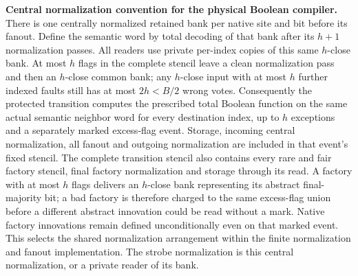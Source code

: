\textbf{Central normalization convention for the physical Boolean compiler.} There is one centrally normalized retained bank per native site and bit before its fanout. Define the semantic word by total decoding of that bank after its \(h+1\) normalization passes. All readers use private per-index copies of this same \(h\)-close bank. At most \(h\) flags in the complete stencil leave a clean normalization pass and then an \(h\)-close common bank; any \(h\)-close input with at most \(h\) further indexed faults still has at most \(2h<B/2\) wrong votes. Consequently the protected transition computes the prescribed total Boolean function on the same actual semantic neighbor word for every destination index, up to \(h\) exceptions and a separately marked excess-flag event. Storage, incoming central normalization, all fanout and outgoing normalization are included in that event's fixed stencil. The complete transition stencil also contains every rare and fair factory stencil, final factory normalization and storage through its read. A factory with at most \(h\) flags delivers an \(h\)-close bank representing its abstract final-majority bit; a bad factory is therefore charged to the same excess-flag union before a different abstract innovation could be read without a mark. Native factory innovations remain defined unconditionally even on that marked event. This selects the shared normalization arrangement within the finite normalization and fanout implementation. The strobe normalization is this central normalization, or a private reader of its bank.

